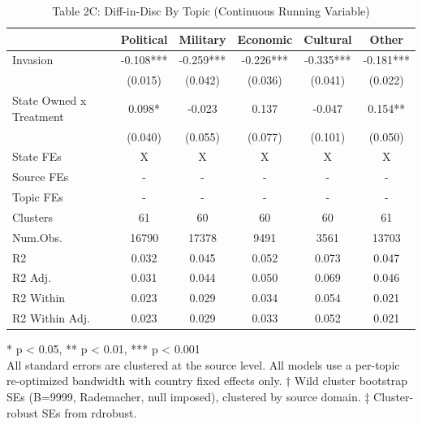 \begin{table}[!t]
\caption{Table 2C: Diff-in-Disc By Topic (Continuous Running Variable)} 
\fontsize{12.0pt}{14.4pt}\selectfont
\begin{tabular*}{\linewidth}{@{\extracolsep{\fill}}lccccc}
\toprule
  & Political & Military & Economic & Cultural & Other \\ 
\midrule\addlinespace[2.5pt]
Invasion & -0.108*** & -0.259*** & -0.226*** & -0.335*** & -0.181*** \\ 
 & (0.015) & (0.042) & (0.036) & (0.041) & (0.022) \\ 
State Owned x Treatment & 0.098* & -0.023 & 0.137 & -0.047 & 0.154** \\ 
{} & {(0.040)} & {(0.055)} & {(0.077)} & {(0.101)} & {(0.050)} \\ 
State FEs & X & X & X & X & X \\ 
Source FEs & - & - & - & - & - \\ 
Topic FEs & - & - & - & - & - \\ 
Clusters & 61 & 60 & 60 & 60 & 61 \\ 
Num.Obs. & 16790 & 17378 & 9491 & 3561 & 13703 \\ 
R2 & 0.032 & 0.045 & 0.052 & 0.073 & 0.047 \\ 
R2 Adj. & 0.031 & 0.044 & 0.050 & 0.069 & 0.046 \\ 
R2 Within & 0.023 & 0.029 & 0.034 & 0.054 & 0.021 \\ 
R2 Within Adj. & 0.023 & 0.029 & 0.033 & 0.052 & 0.021 \\ 
\bottomrule
\end{tabular*}
\begin{minipage}{\linewidth}
* p < 0.05, ** p < 0.01, *** p < 0.001\\
All standard errors are clustered at the source level. All models use a
per-topic re-optimized bandwidth with country fixed effects only. † Wild cluster
bootstrap SEs (B=9999, Rademacher, null imposed), clustered by source domain. ‡
Cluster-robust SEs from rdrobust.\\
\end{minipage}
\end{table}


